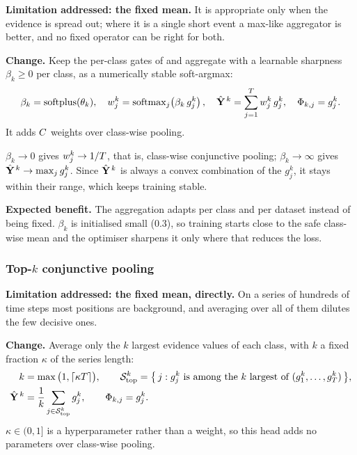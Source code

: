 \textbf{Limitation addressed: the fixed mean.} It is appropriate only when the evidence is spread
out; where it is a single short event a max-like aggregator is better, and no fixed operator can be
right for both.

\textbf{Change.} Keep the per-class gates of  and aggregate with a learnable
sharpness $\beta_k \geq 0$ per class, as a numerically stable soft-argmax:
\begin{equation}
  \beta_k = \operatorname{softplus}(\theta_k), \quad
  w_j^k = \operatorname{softmax}_j\!\left(\beta_k \, g_j^k\right), \quad
  \hat{\mathbf{Y}}^{\,k} = \sum_{j=1}^{T} w_j^k \, g_j^k,
  \quad
  \Phi_{k,j} = g_j^k .
  \label{eq:ad_bag}
\end{equation}
It adds $C$ weights over class-wise pooling.

\begin{property}
\label{prop:ad}
$\beta_k \to 0$ gives $w_j^k \to 1/T$, that is, class-wise conjunctive pooling;
$\beta_k \to \infty$ gives $\hat{\mathbf{Y}}^{\,k} \to \max_j g_j^k$. Since $\hat{\mathbf{Y}}^{\,k}$ is always a
convex combination of the $g_j^k$, it stays within their range, which keeps training stable.
\end{property}

\textbf{Expected benefit.} The aggregation adapts per class and per dataset instead of being fixed.
$\beta_k$ is initialised small (0.3), so training starts close to the safe class-wise mean and the
optimiser sharpens it only where that reduces the loss.

\subsubsection{Top-$k$ conjunctive pooling}
\label{sec:pool:topk}

\textbf{Limitation addressed: the fixed mean, directly.} On a series of hundreds of time steps most
positions
are background, and averaging over all of them dilutes the few decisive ones.

\textbf{Change.} Average only the $k$ largest evidence values of each class, with $k$ a fixed
fraction $\kappa$ of the series length:
\begin{align}
  k &= \max\big(1, \lceil \kappa T \rceil\big),
  \qquad
  \mathcal{S}^k_{\text{top}} = \big\{\, j : g_j^k \text{ is among the } k
    \text{ largest of } (g_1^k,\dots,g_{T}^k) \,\big\},
  \label{eq:topk_set}\\
  \hat{\mathbf{Y}}^{\,k} &= \frac{1}{k}\sum_{j \in \mathcal{S}^k_{\text{top}}} g_j^k,
  \qquad
  \Phi_{k,j} = g_j^k .
  \label{eq:topk_bag}
\end{align}
$\kappa \in (0,1]$ is a hyperparameter rather than a weight, so this head adds no parameters over
class-wise pooling.

